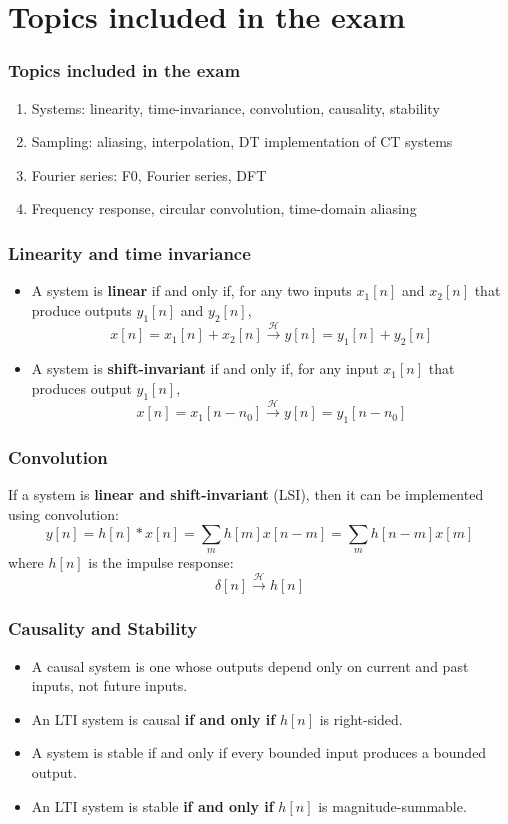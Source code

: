 \documentclass{beamer}
\begin{document}
\section[Topics]{Topics included in the exam}
\setcounter{subsection}{1}

\begin{frame}
  \frametitle{Topics included in the exam}

  \begin{enumerate}
  \item Systems: linearity, time-invariance, convolution, causality, stability
  \item Sampling: aliasing, interpolation, DT implementation of CT systems
  \item Fourier series: F0, Fourier series, DFT
  \item Frequency response, circular convolution, time-domain aliasing
  \end{enumerate}
\end{frame}

\begin{frame}
  \frametitle{Linearity and time invariance}
  \begin{itemize}
  \item A system is {\bf linear} if and only if, for any two inputs
    $x_1[n]$ and $x_2[n]$ that produce outputs $y_1[n]$ and $y_2[n]$,
    \[
    x[n]=x_1[n]+x_2[n] \stackrel{\mathcal H}{\longrightarrow}  y[n]=y_1[n]+y_2[n]
    \]
  \item A system is {\bf shift-invariant} if and only if, for any input
    $x_1[n]$ that produces output $y_1[n]$,
    \[
    x[n]=x_1[n-n_0] \stackrel{\mathcal H}{\longrightarrow}  y[n]=y_1[n-n_0]
    \]
  \end{itemize}
\end{frame}

\begin{frame}
  \frametitle{Convolution}

  If a system is {\bf linear and shift-invariant} (LSI), then it can
  be implemented using convolution:
    \[
    y[n] = h[n]\ast x[n] = \sum_m h[m] x[n-m] = \sum_m h[n-m] x[m]
    \]
    where $h[n]$ is the impulse response:
    \[
    \delta[n] \stackrel{\mathcal H}{\longrightarrow}  h[n]
    \]
\end{frame}

\begin{frame}
  \frametitle{Causality and Stability}

  \begin{itemize}
  \item A causal system is one whose outputs depend only on
    current and past inputs, not future inputs.
  \item An LTI system is causal \textbf{if and only if} $h[n]$ is
    right-sided.
  \item A system is stable if and only if every bounded input produces
    a bounded output.
  \item An LTI system is stable \textbf{if and only if} $h[n]$ is
    magnitude-summable.
  \end{itemize}
\end{frame}
\end{document}
